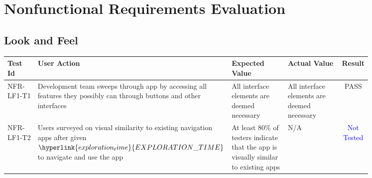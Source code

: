 \documentclass[12pt, titlepage]{article}
\begin{document}
\pagebreak

\section{Nonfunctional Requirements Evaluation}

\subsection{Look and Feel}
\begin{center}
\begin{tabular}{|p{0.10\linewidth}|p{0.35\linewidth}|p{0.20\linewidth}|p{0.20\linewidth}|c|} 
\hline
\textbf{Test Id} & \textbf{User Action} & \textbf{Expected Value} &
\textbf{Actual Value} & \textbf{Result} \\
\hline 
NFR-LF1-T1 & Development team sweeps through app by accessing all features they
possibly can through buttons and other interfaces & All interface elements are
deemed necessary & All interface elements are deemed necessary &
\textcolor{OliveGreen}{PASS}\\
\hline 
NFR-LF1-T2 & Users surveyed on visual similarity to existing navigation apps
after given $\hyperlink{exploration_time}{EXPLORATION\_TIME}$ to navigate and
use the app & At least 80\% of testers indicate that the app is visually similar
to existing apps & N/A & \textcolor{Blue}{Not Tested}\\
\hline 
\end{tabular}
\end{center}
\end{document}
